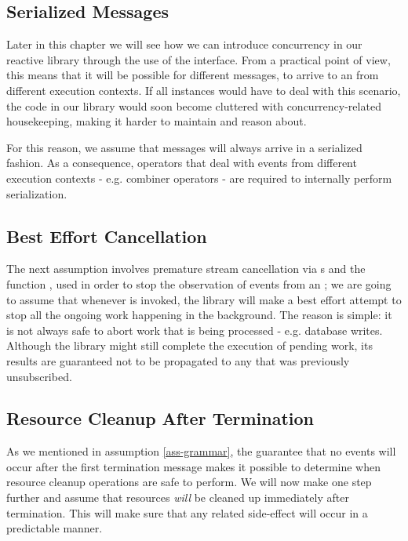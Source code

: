 \subsection{Serialized Messages}
\label{ass-serialized}
Later in this chapter we will see how we can introduce concurrency in our reactive library through the use of the  interface. From a practical point of view, this means that it will be possible for different messages, to arrive to an  from different execution contexts. If all  instances would have to deal with this scenario, the code in our library would soon become cluttered with concurrency-related housekeeping, making it harder to maintain and reason about.

For this reason, we assume that messages will always arrive in a serialized fashion. As a consequence, operators that deal with events from different execution contexts - e.g. combiner operators - are required to internally perform serialization.

\subsection{Best Effort Cancellation}
\label{ass-besteffort}
The next assumption involves premature stream cancellation via s and the function , used in order to stop the observation of events from an ; we are going to assume that whenever  is invoked, the library will make a best effort attempt to stop all the ongoing work happening in the background. The reason is simple: it is not always safe to abort work that is being processed - e.g. database writes. Although the library might still complete the execution of pending work, its results are guaranteed not to be propagated to any  that was previously unsubscribed.

\subsection{Resource Cleanup After Termination}
As we mentioned in assumption \ref{ass-grammar}, the guarantee that no events will occur after the first termination message makes it possible to determine when resource cleanup operations are safe to perform. We will now make one step further and assume that resources \textit{will} be cleaned up immediately after termination. This will make sure that any related side-effect will occur in a predictable manner.

